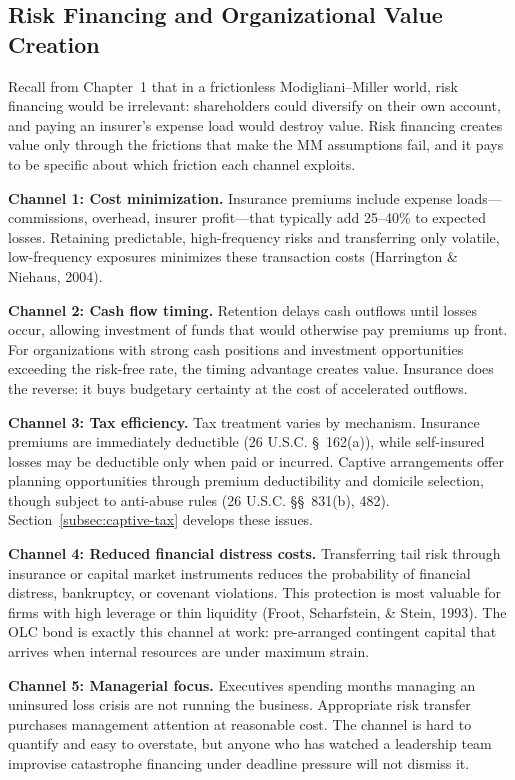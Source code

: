 \documentclass[11pt,openany]{book}
\begin{document}
\subsection{Risk Financing and Organizational Value Creation}
\label{subsec:value-channels}

Recall from Chapter~1 that in a
frictionless Modigliani--Miller world, risk financing would be irrelevant:
shareholders could diversify on their own account, and paying an insurer's
expense load would destroy value. Risk financing creates value only through
the frictions that make the MM assumptions fail, and it pays to be specific
about which friction each channel exploits.

\textbf{Channel 1: Cost minimization.} Insurance premiums include expense
loads---commissions, overhead, insurer profit---that typically add 25--40\%
to expected losses. Retaining predictable, high-frequency risks and
transferring only volatile, low-frequency exposures minimizes these
transaction costs (Harrington \& Niehaus, 2004).

\textbf{Channel 2: Cash flow timing.} Retention delays cash outflows until
losses occur, allowing investment of funds that would otherwise pay premiums
up front. For organizations with strong cash positions and investment
opportunities exceeding the risk-free rate, the timing advantage creates
value. Insurance does the reverse: it buys budgetary certainty at the cost of
accelerated outflows.

\textbf{Channel 3: Tax efficiency.} Tax treatment varies by mechanism.
Insurance premiums are immediately deductible (26 U.S.C. \S~162(a)), while
self-insured losses may be deductible only when paid or incurred. Captive
arrangements offer planning opportunities through premium deductibility and
domicile selection, though subject to anti-abuse rules (26 U.S.C.
\S\S~831(b), 482). Section~\ref{subsec:captive-tax} develops these issues.

\textbf{Channel 4: Reduced financial distress costs.} Transferring tail risk
through insurance or capital market instruments reduces the probability of
financial distress, bankruptcy, or covenant violations. This protection is
most valuable for firms with high leverage or thin liquidity (Froot,
Scharfstein, \& Stein, 1993). The OLC bond is exactly this channel at work:
pre-arranged contingent capital that arrives when internal resources are
under maximum strain.

\textbf{Channel 5: Managerial focus.} Executives spending months managing an
uninsured loss crisis are not running the business. Appropriate risk transfer
purchases management attention at reasonable cost. The channel is hard to
quantify and easy to overstate, but anyone who has watched a leadership team
improvise catastrophe financing under deadline pressure will not dismiss it.
\end{document}
